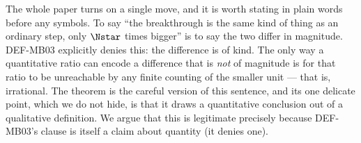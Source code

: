 \documentclass[12pt, a4paper]{article}
\begin{document}
The whole paper turns on a single move, and it is worth stating in plain
words before any symbols. To say ``the breakthrough is the same kind of
thing as an ordinary step, only $\Nstar$ times bigger'' is to say the two
differ in magnitude. DEF-MB03 explicitly denies this: the difference is
of kind. The only way a quantitative ratio can encode a difference that
is \emph{not} of magnitude is for that ratio to be unreachable by any
finite counting of the smaller unit --- that is, irrational. The theorem
is the careful version of this sentence, and its one delicate point,
which we do not hide, is that it draws a quantitative conclusion out of a
qualitative definition. We argue that this is legitimate precisely
because DEF-MB03's clause is itself a claim about quantity (it denies
one).
\end{document}

